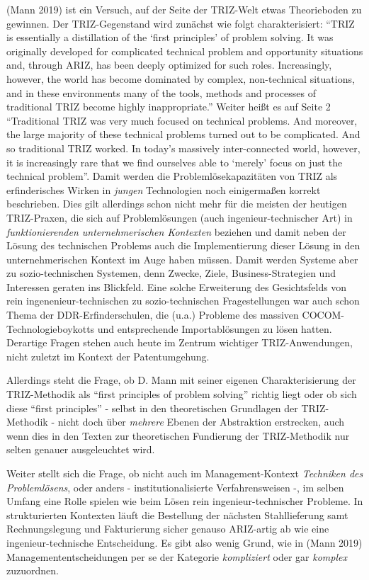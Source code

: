 \documentclass[11pt,a4paper]{article}
\begin{document}
(Mann 2019) ist ein Versuch, auf der Seite der TRIZ-Welt etwas
Theorieboden zu gewinnen. Der TRIZ-Gegenstand wird zunächst wie folgt
charakterisiert: ``TRIZ is essentially a distillation of the `first
principles' of problem solving. It was originally developed for
complicated technical problem and opportunity situations and, through
ARIZ, has been deeply optimized for such roles. Increasingly, however,
the world has become dominated by complex, non-technical situations, and
in these environments many of the tools, methods and processes of
traditional TRIZ become highly inappropriate.'' Weiter heißt es auf
Seite 2 ``Traditional TRIZ was very much focused on technical problems.
And moreover, the large majority of these technical problems turned out
to be complicated. And so traditional TRIZ worked. In today's massively
inter-connected world, however, it is increasingly rare that we find
ourselves able to `merely' focus on just the technical problem''. Damit
werden die Problemlösekapazitäten von TRIZ als erfinderisches Wirken in
\emph{jungen} Technologien noch einigermaßen korrekt beschrieben. Dies
gilt allerdings schon nicht mehr für die meisten der heutigen
TRIZ-Praxen, die sich auf Problemlösungen (auch ingenieur-technischer
Art) in \emph{funktionierenden unternehmerischen Kontexten} beziehen und
damit neben der Lösung des technischen Problems auch die Implementierung
dieser Lösung in den unternehmerischen Kontext im Auge haben müssen.
Damit werden Systeme aber zu sozio-technischen Systemen, denn Zwecke,
Ziele, Business-Strategien und Interessen geraten ins Blickfeld. Eine
solche Erweiterung des Gesichtsfelds von rein ingenenieur-technischen zu
sozio-technischen Fragestellungen war auch schon Thema der
DDR-Erfinderschulen, die (u.a.) Probleme des massiven
COCOM-Technologieboykotts und entsprechende Importablösungen zu lösen
hatten. Derartige Fragen stehen auch heute im Zentrum wichtiger
TRIZ-Anwendungen, nicht zuletzt im Kontext der Patentumgehung.

Allerdings steht die Frage, ob D. Mann mit seiner eigenen
Charakterisierung der TRIZ-Methodik als ``first principles of problem
solving'' richtig liegt oder ob sich diese ``first principles'' - selbst
in den theoretischen Grundlagen der TRIZ-Methodik - nicht doch über
\emph{mehrere} Ebenen der Abstraktion erstrecken, auch wenn dies in den
Texten zur theoretischen Fundierung der TRIZ-Methodik nur selten genauer
ausgeleuchtet wird.

Weiter stellt sich die Frage, ob nicht auch im Management-Kontext
\emph{Techniken des Problemlösens}, oder anders - institutionalisierte
Verfahrensweisen -, im selben Umfang eine Rolle spielen wie beim Lösen
rein ingenieur-technischer Probleme. In strukturierten Kontexten läuft
die Bestellung der nächsten Stahllieferung samt Rechnungslegung und
Fakturierung sicher genauso ARIZ-artig ab wie eine ingenieur-technische
Entscheidung. Es gibt also wenig Grund, wie in (Mann 2019)
Managemententscheidungen per se der Kategorie \emph{kompliziert} oder
gar \emph{komplex} zuzuordnen.
\end{document}
